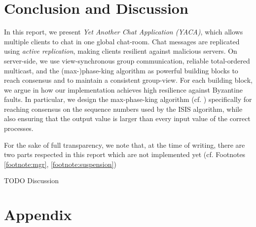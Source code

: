 \documentclass[runningheads]{llncs}
\begin{document}
\section{Conclusion and Discussion} \label{sec:conclusion}
In this report, we present \textit{Yet Another Chat Application (YACA)}, which allows multiple clients to chat in one global chat-room. Chat messages are replicated using \textit{active replication}, making clients resilient against malicious servers. On server-side, we use view-synchronous group communication, reliable total-ordered multicast, and the (max-)phase-king algorithm as powerful building blocks to reach consensus and to maintain a consistent group-view. For each building block, we argue in  how our implementation achieves high resilience against Byzantine faults. In particular, we design the max-phase-king algorithm (cf. ) specifically for reaching consensus on the sequence numbers used by the ISIS algorithm, while also ensuring that the output value is larger than every input value of the correct processes. 

For the sake of full transparency, we note that, at the time of writing, there are two parts respected in this report which are not implemented yet (cf. Footnotes \ref{footnote:mgr}, \ref{footnote:suspension})

TODO Discussion

%
%


\newpage 
\appendix
\section{Appendix}\label{appendix}
\end{document}
